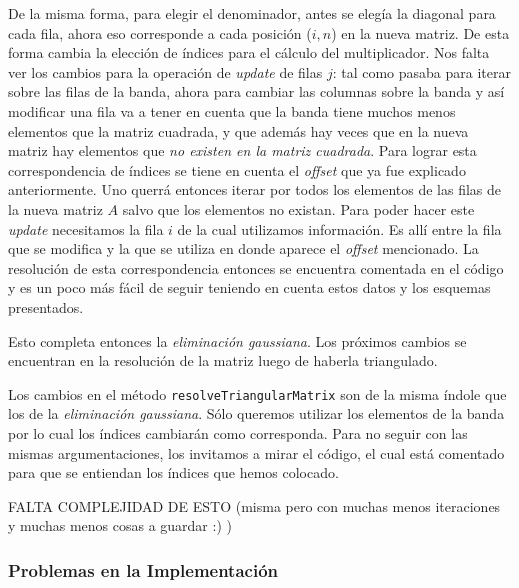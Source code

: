 De la misma forma, para elegir el denominador, antes se elegía la diagonal para cada fila, ahora eso corresponde a cada posición ($i,n$) en la nueva matriz. De esta forma cambia la elección de índices para el cálculo del multiplicador. Nos falta ver los cambios para la operación de \textit{update} de filas $j$: tal como pasaba para iterar sobre las filas de la banda, ahora para cambiar las columnas sobre la banda y así modificar una fila va a tener en cuenta que la banda tiene muchos menos elementos que la matriz cuadrada, y que además hay veces que en la nueva matriz hay elementos que \textit{no existen en la matriz cuadrada}. Para lograr esta correspondencia de índices se tiene en cuenta el \textit{offset} que ya fue explicado anteriormente. Uno querrá entonces iterar por todos los elementos de las filas de la nueva matriz $A$ salvo que los elementos no existan. Para poder hacer este \textit{update} necesitamos la fila $i$ de la cual utilizamos información. Es allí entre la fila que se modifica y la que se utiliza en donde aparece el \textit{offset} mencionado. La resolución de esta correspondencia entonces se encuentra comentada en el código y es un poco más fácil de seguir teniendo en cuenta estos datos y los esquemas presentados.

Esto completa entonces la \textit{eliminación gaussiana}. Los próximos cambios se encuentran en la resolución de la matriz luego de haberla triangulado.

\vspace{\baselineskip}

Los cambios en el método \texttt{resolveTriangularMatrix} son de la misma índole que los de la \textit{eliminación gaussiana}. Sólo queremos utilizar los elementos de la banda por lo cual los índices cambiarán como corresponda. Para no seguir con las mismas argumentaciones, los invitamos a mirar el código, el cual está comentado para que se entiendan los índices que hemos colocado.
\vspace{\baselineskip}

FALTA COMPLEJIDAD DE ESTO (misma pero con muchas menos iteraciones y muchas menos cosas a guardar :) )
\subsubsection{Problemas en la Implementación}

